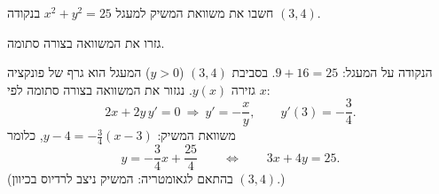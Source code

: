 
\begin{question}
חשבו את משוואת המשיק למעגל $x^2+y^2=25$ בנקודה $(3,4)$.
\end{question}

\begin{hint}
גזרו את המשוואה בצורה סתומה.
\end{hint}

\begin{solution}
הנקודה על המעגל: $9+16=25$. בסביבת $(3,4)$ ($y>0$) המעגל הוא גרף של פונקציה גזירה $y(x)$. נגזור את המשוואה בצורה סתומה לפי $x$:
\[ 2x+2y\,y'=0\ \Longrightarrow\ y'=-\frac{x}{y},\qquad y'(3)=-\frac34. \]
משוואת המשיק: $y-4=-\frac34(x-3)$, כלומר
\[ y=-\frac34x+\frac{25}{4}\qquad\Longleftrightarrow\qquad 3x+4y=25. \]
(בהתאם לגאומטריה: המשיק ניצב לרדיוס בכיוון $(3,4)$.)
\end{solution}
